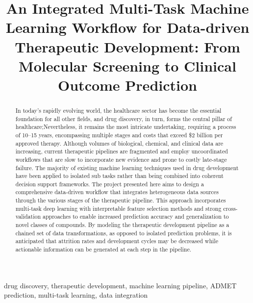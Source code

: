 \documentclass[conference]{IEEEtran}
\begin{document}
\title{An Integrated Multi-Task Machine Learning Workflow for Data-driven Therapeutic Development: From Molecular Screening to Clinical Outcome Prediction\\
}

\author{
}
\maketitle

\begin{abstract}
In today’s rapidly evolving world, the healthcare sector has become the essential foundation for all other fields, and drug discovery, in turn, forms the central pillar of healthcare;Nevertheless, it remains the most intricate undertaking, requiring a process of 10–15 years, encompassing multiple stages and costs that exceed \$2 billion per approved therapy. Although volumes of biological, chemical, and clinical data are increasing, current therapeutic pipelines are fragmented and employ uncoordinated workflows that are slow to incorporate new evidence and prone to costly late-stage failure. The majority of existing machine learning techniques used in drug development have been applied to isolated sub tasks rather than being combined into coherent decision support frameworks. The project presented here aims to design a comprehensive data-driven workflow that integrates heterogeneous data sources through the various stages of the therapeutic pipeline. This approach incorporates multi-task deep learning with interpretable feature selection methods and strong cross-validation approaches to enable increased prediction accuracy and generalization to novel classes of compounds. By modeling the therapeutic development pipeline as a chained set of data transformations, as opposed to isolated prediction problems, it is anticipated that attrition rates and development cycles may be decreased while actionable information can be generated at each step in the pipeline. 
\end{abstract}

\begin{IEEEkeywords}
drug discovery, therapeutic development, machine learning
pipeline, ADMET prediction, multi-task learning, data
integration
\end{IEEEkeywords}
\end{document}
